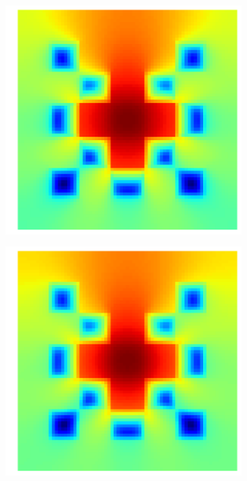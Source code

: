 \begin{figure}[h]
\centering
\begin{subfigure}{0.49\columnwidth}
\includegraphics[width=\columnwidth]{04_pn_method/results/checkerboard2d_p5_neumann_staggered_starmap.png}
\end{subfigure}%
\hspace{0.01\columnwidth}
\begin{subfigure}{0.49\columnwidth}
\includegraphics[width=\columnwidth]{04_pn_method/results/checkerboard2d_p5_neumann_staggered.png}

\end{subfigure}
\end{figure}
